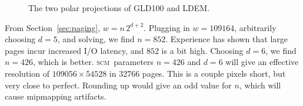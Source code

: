 \documentclass[oneside,10pt]{memoir}
\newcommand{\scm}     {\textsc{scm}}
\begin{document}
\begin{Spacing}{1.1}
\begin{figure}
  \centering
  \caption{The two polar projections of GLD100 and LDEM.}
  \label{fig:glde}
\end{figure}

From Section~\ref{sec:paging}, $w=n\,2^{d+2}$. Plugging in $w=\num{109164}$, arbitrarily choosing $d=5$, and solving, we find $n=852$. Experience has shown that large pages incur increased I/O latency, and $852$ is a bit high. Choosing $d=6$, we find $n=426$, which is better. \scm\ parameters $n=426$ and $d=6$ will give an effective resolution of $\num{109056}\times\num{54528}$ in $\num{32766}$ pages. This is a couple pixels short, but very close to perfect. Rounding up would give an odd value for $n$, which will cause mipmapping artifacts.


\end{Spacing}
\end{document}
